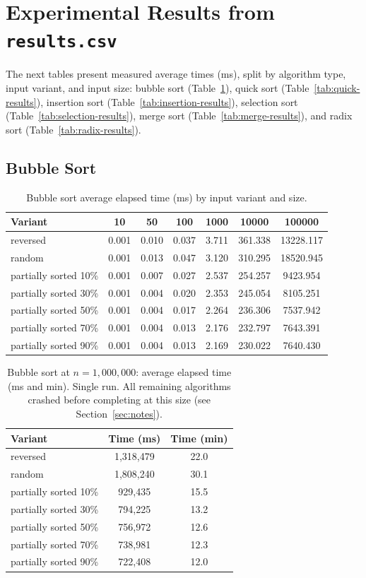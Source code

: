 \documentclass[11pt,a4paper]{article}
\begin{document}
\section{Experimental Results from \texttt{results.csv}}
The next tables present measured average times (ms), split by algorithm type, input variant, and input size: bubble sort (Table~\ref{tab:bubble-results}), quick sort (Table~\ref{tab:quick-results}), insertion sort (Table~\ref{tab:insertion-results}), selection sort (Table~\ref{tab:selection-results}), merge sort (Table~\ref{tab:merge-results}), and radix sort (Table~\ref{tab:radix-results}).

\subsection{Bubble Sort}
\begin{table}[H]
\centering
\footnotesize
\begin{tabular}{lcccccc}
\toprule
Variant & 10 & 50 & 100 & 1000 & 10000 & 100000 \\
\midrule
reversed & 0.001 & 0.010 & 0.037 & 3.711 & 361.338 & 13228.117 \\
random & 0.001 & 0.013 & 0.047 & 3.120 & 310.295 & 18520.945 \\
partially sorted 10\% & 0.001 & 0.007 & 0.027 & 2.537 & 254.257 & 9423.954 \\
partially sorted 30\% & 0.001 & 0.004 & 0.020 & 2.353 & 245.054 & 8105.251 \\
partially sorted 50\% & 0.001 & 0.004 & 0.017 & 2.264 & 236.306 & 7537.942 \\
partially sorted 70\% & 0.001 & 0.004 & 0.013 & 2.176 & 232.797 & 7643.391 \\
partially sorted 90\% & 0.001 & 0.004 & 0.013 & 2.169 & 230.022 & 7640.430 \\
\bottomrule
\end{tabular}
\caption{Bubble sort average elapsed time (ms) by input variant and size.}
\label{tab:bubble-results}
\end{table}

\begin{table}[H]
\centering
\begin{tabular}{lcc}
\toprule
Variant & Time (ms) & Time (min) \\
\midrule
reversed & 1{,}318{,}479 & 22.0 \\
random & 1{,}808{,}240 & 30.1 \\
partially sorted 10\% & 929{,}435 & 15.5 \\
partially sorted 30\% & 794{,}225 & 13.2 \\
partially sorted 50\% & 756{,}972 & 12.6 \\
partially sorted 70\% & 738{,}981 & 12.3 \\
partially sorted 90\% & 722{,}408 & 12.0 \\
\bottomrule
\end{tabular}
\caption{Bubble sort at \(n=1{,}000{,}000\): average elapsed time (ms and min). Single run. All remaining algorithms crashed before completing at this size (see Section~\ref{sec:notes}).}
\label{tab:bubble-1m}
\end{table}
\end{document}
